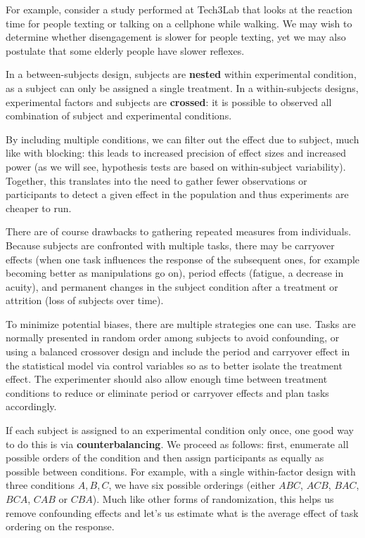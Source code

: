 \documentclass[
  11pt,
  letterpaper,
]{scrbook}
\theoremstyle{definition}
\theoremstyle{remark}
\begin{document}
For example, consider a study performed at Tech3Lab that looks at the
reaction time for people texting or talking on a cellphone while
walking. We may wish to determine whether disengagement is slower for
people texting, yet we may also postulate that some elderly people have
slower reflexes.

In a between-subjects design, subjects are \textbf{nested} within
experimental condition, as a subject can only be assigned a single
treatment. In a within-subjects designs, experimental factors and
subjects are \textbf{crossed}: it is possible to observed all
combination of subject and experimental conditions.

By including multiple conditions, we can filter out the effect due to
subject, much like with blocking: this leads to increased precision of
effect sizes and increased power (as we will see, hypothesis tests are
based on within-subject variability). Together, this translates into the
need to gather fewer observations or participants to detect a given
effect in the population and thus experiments are cheaper to run.

There are of course drawbacks to gathering repeated measures from
individuals. Because subjects are confronted with multiple tasks, there
may be carryover effects (when one task influences the response of the
subsequent ones, for example becoming better as manipulations go on),
period effects (fatigue, a decrease in acuity), and permanent changes in
the subject condition after a treatment or attrition (loss of subjects
over time).

To minimize potential biases, there are multiple strategies one can use.
Tasks are normally presented in random order among subjects to avoid
confounding, or using a balanced crossover design and include the period
and carryover effect in the statistical model via control variables so
as to better isolate the treatment effect. The experimenter should also
allow enough time between treatment conditions to reduce or eliminate
period or carryover effects and plan tasks accordingly.

If each subject is assigned to an experimental condition only once, one
good way to do this is via \textbf{counterbalancing}. We proceed as
follows: first, enumerate all possible orders of the condition and then
assign participants as equally as possible between conditions. For
example, with a single within-factor design with three conditions
\(A, B, C\), we have six possible orderings (either \(ABC\), \(ACB\),
\(BAC\), \(BCA\), \(CAB\) or \(CBA\)). Much like other forms of
randomization, this helps us remove confounding effects and let's us
estimate what is the average effect of task ordering on the response.
\end{document}
